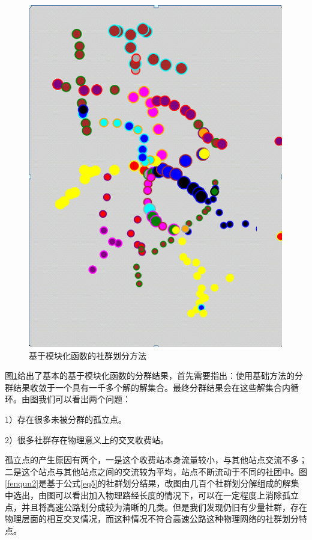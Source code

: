 			\begin{figure}[h]
			\centering
					\begin{minipage}{0.8\linewidth}
						\centering
						\includegraphics[width=4.4in]{picture/liuliangbianquan}
						\caption{基于模块化函数的社群划分方法}
						\label{gulidian}
					\end{minipage}
			\end{figure}

		图\ref{gulidian}给出了基本的基于模块化函数的分群结果，首先需要指出：使用基础方法的分群结果收敛于一个具有一千多个解的解集合。最终分群结果会在这些解集合内循环。由图我们可以看出两个问题：

		1）存在很多未被分群的孤立点。

		2）很多社群存在物理意义上的交叉收费站。

		孤立点的产生原因有两个，一是这个收费站本身流量较小，与其他站点交流不多；二是这个站点与其他站点之间的交流较为平均，站点不断流动于不同的社团中。图\ref{fenqun2}是基于公式\ref{eq5}的社群划分结果，改图由几百个社群划分解组成的解集中选出，由图可以看出加入物理路经长度的情况下，可以在一定程度上消除孤立点，并且将高速公路划分成较为清晰的几类。但是我们发现仍旧有少量社群，存在物理层面的相互交叉情况，而这种情况不符合高速公路这种物理网络的社群划分特点。

